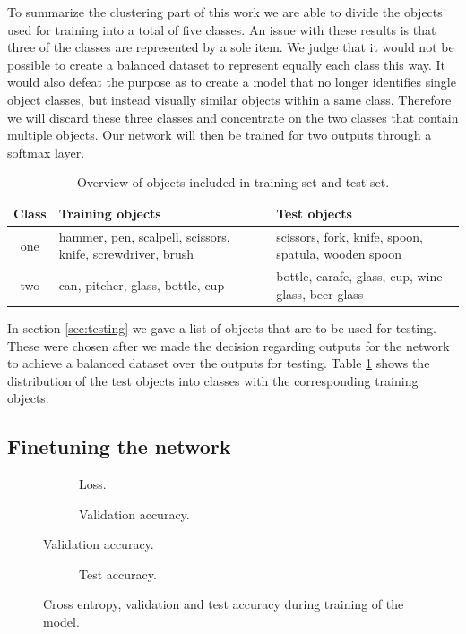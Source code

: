 To summarize the clustering part of this work we are able to divide the objects used for training into a total of five classes. An issue with these results is that three of the classes are represented by a sole item. We judge that it would not be possible to create a balanced dataset to represent equally each class this way. It would also defeat the purpose as to create a model that no longer identifies single object classes, but instead visually similar objects within a same class. Therefore we will discard these three classes and concentrate on the two classes that contain multiple objects. Our network will then be trained for two outputs through a softmax layer.

\begin{table}
	\begin{tabular}{|c|p{5cm}|p{5cm}|}
		\hline
		Class & Training objects & Test objects \\
		\hline
		one & hammer, pen, scalpell, scissors, knife, screwdriver, brush & scissors, fork, knife, spoon, spatula, wooden spoon \\
		\hline
		two & can, pitcher, glass, bottle, cup & bottle, carafe, glass, cup, wine glass, beer glass \\
		\hline
	\end{tabular}
	\caption{Overview of objects included in training set and test set.}
	\label{tab:classification_objects}
\end{table}

In section \ref{sec:testing} we gave a list of objects that are to be used for testing. These were chosen after we made the decision regarding outputs for the network to achieve a balanced dataset over the outputs for testing. Table \ref{tab:classification_objects} shows the distribution of the test objects into classes with the corresponding training objects.


\subsection{Finetuning the network}

\begin{figure}
	\centering
	\begin{subfigure}[b]{\textwidth}
		
		\caption{Loss.}
		\label{fig:results_plots_loss}
	\end{subfigure}
	\begin{subfigure}[b]{\textwidth}
		
		\caption{Validation accuracy.}
		\label{fig:results_plots_val}
	\end{subfigure}
\end{figure}
\begin{figure}
	\ContinuedFloat
	\begin{subfigure}[b]{\textwidth}
		
		\caption{Test accuracy.}
		\label{fig:results_plots_test}
	\end{subfigure}
	\label{fig:results_plots}
	\caption{Cross entropy, validation and test accuracy during training of the model.}
\end{figure}

